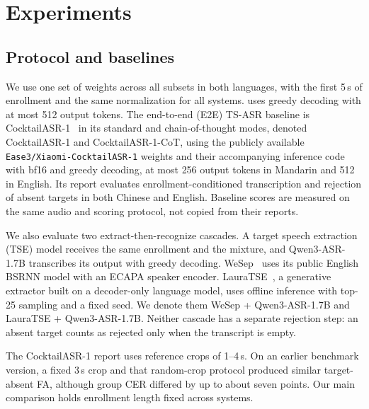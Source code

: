 \section{Experiments}
\label{sec:experiments}
\subsection{Protocol and baselines}
We use one set of \model weights across all subsets in both languages, with the first 5\,s of enrollment and the same normalization for all systems.
\model uses greedy decoding with at most 512 output tokens.
The end-to-end (E2E) TS-ASR baseline is CocktailASR-1~\cite{zhang2026xiaomi} in its standard and chain-of-thought modes, denoted CocktailASR-1 and CocktailASR-1-CoT, using the publicly available \texttt{Ease3/Xiaomi-CocktailASR-1} weights and their accompanying inference code with bf16 and greedy decoding, at most 256 output tokens in Mandarin and 512 in English.
Its report evaluates enrollment-conditioned transcription and rejection of absent targets in both Chinese and English.
Baseline scores are measured on the same audio and scoring protocol, not copied from their reports.

We also evaluate two extract-then-recognize cascades.
A target speech extraction (TSE) model receives the same enrollment and the mixture, and Qwen3-ASR-1.7B transcribes its output with greedy decoding.
WeSep~\cite{wang2024wesep} uses its public English BSRNN model with an ECAPA speaker encoder.
LauraTSE~\cite{tang2025lauratse}, a generative extractor built on a decoder-only language model, uses offline inference with top-25 sampling and a fixed seed.
We denote them WeSep + Qwen3-ASR-1.7B and LauraTSE + Qwen3-ASR-1.7B.
Neither cascade has a separate rejection step: an absent target counts as rejected only when the transcript is empty.

The CocktailASR-1 report uses reference crops of 1--4\,s.
On an earlier benchmark version, a fixed 3\,s crop and that random-crop protocol produced similar target-absent FA, although group CER differed by up to about seven points.
Our main comparison holds enrollment length fixed across systems.

